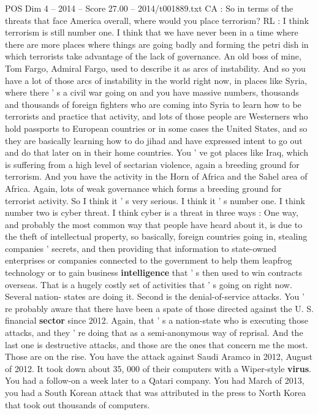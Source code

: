 \begin{textsample}{POS Dim 4 – 2014 – Score 27.00 – 2014/t001889.txt}
CA : So in terms of the threats that face America overall, where would you place terrorism?
RL : I think terrorism is still number one.
I think that we have never been in a time where there are more places where things are going badly and forming the petri dish in which terrorists take advantage of the lack of governance.
An old boss of mine, Tom Fargo, Admiral Fargo, used to describe it as arcs of instability.
And so you have a lot of those arcs of instability in the world right now, in places like Syria, where there ' s a civil war going on and you have massive numbers, thousands and thousands of foreign fighters who are coming into Syria to learn how to be terrorists and practice that activity, and lots of those people are Westerners who hold passports to European countries or in some cases the United States, and so they are basically learning how to do jihad and have expressed intent to go out and do that later on in their home countries.
You ' ve got places like Iraq, which is suffering from a high level of sectarian violence, again a breeding ground for terrorism.
And you have the activity in the Horn of Africa and the Sahel area of Africa.
Again, lots of weak governance which forms a breeding ground for terrorist activity.
So I think it ' s very serious.
I think it ' s number one.
I think number two is cyber threat.
I think cyber is a threat in three ways : One way, and probably the most common way that people have heard about it, is due to the theft of intellectual property, so basically, foreign countries going in, stealing companies ' secrets, and then providing that information to state-owned enterprises or companies connected to the government to help them leapfrog technology or to gain business \textbf{intelligence} that ' s then used to win contracts overseas.
That is a hugely costly set of activities that ' s going on right now.
Several nation- states are doing it.
Second is the denial-of-service attacks.
You ' re probably aware that there have been a spate of those directed against the U.
S. financial \textbf{sector} since 2012.
Again, that ' s a nation-state who is executing those attacks, and they ' re doing that as a semi-anonymous way of reprisal.
And the last one is destructive attacks, and those are the ones that concern me the most.
Those are on the rise.
You have the attack against Saudi Aramco in 2012, August of 2012.
It took down about 35, 000 of their computers with a Wiper-style \textbf{virus}.
You had a follow-on a week later to a Qatari company.
You had March of 2013, you had a South Korean attack that was attributed in the press to North Korea that took out thousands of computers.

\end{textsample}
